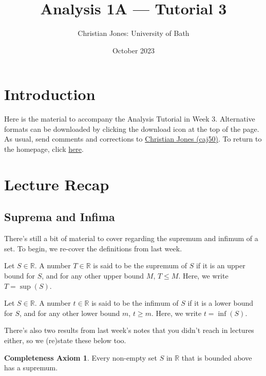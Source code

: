\documentclass[
  12pt,
  a4paper]{extarticle}
\title{Analysis 1A --- Tutorial 3}
\author{Christian Jones: University of Bath}
\date{October 2023}
\theoremstyle{plain}
\theoremstyle{definition}
\theoremstyle{plain}
\theoremstyle{plain}
\theoremstyle{plain}
\theoremstyle{plain}
\theoremstyle{definition}
\theoremstyle{definition}
\newtheorem*{Completeness Axiom*}{Completeness Axiom}\newtheorem{Completeness Axiom}{Completeness Axiom}[section]
\theoremstyle{remark}
\theoremstyle{remark}
\let\BeginKnitrBlock\begin \let\EndKnitrBlock\end
\renewcommand{\;}{\,}
\begin{document}
\maketitle

{
\setcounter{tocdepth}{2}
\tableofcontents
}
\newpage
{}

\hypertarget{introduction}{%
\section*{Introduction}\label{introduction}}

Here is the material to accompany the Analysis Tutorial in Week 3. Alternative formats can be downloaded by clicking the download icon at the top of the page. As usual, send comments and corrections to \href{mailto:caj50@bath.ac.uk}{Christian Jones (caj50)}. To return to the homepage, click \href{http://caj50.github.io/tutoring.html}{here}.

\hypertarget{lecture-recap}{%
\section{Lecture Recap}\label{lecture-recap}}

\hypertarget{suprema-and-infima}{%
\subsection{Suprema and Infima}\label{suprema-and-infima}}

There's still a bit of material to cover regarding the supremum and infimum of a set. To begin, we re-cover the definitions from last week.
\BeginKnitrBlock{definition}[Supremum]
{\label{def:def1} }Let \(S \in \mathbb{R}\). A number \(T \in \mathbb{R}\) is said to be the supremum of \(S\) if it is an upper bound for \(S\), and for any other upper bound \(M\), \(T \leq M\). Here, we write \(T = \sup(S)\).
\EndKnitrBlock{definition}

\BeginKnitrBlock{definition}[Infimum]
{\label{def:def2} }Let \(S \in \mathbb{R}\). A number \(t \in \mathbb{R}\) is said to be the infimum of \(S\) if it is a lower bound for \(S\), and for any other lower bound \(m\), \(t\geq m\). Here, we write \(t = \inf(S)\).
\EndKnitrBlock{definition}
There's also two results from last week's notes that you didn't reach in lectures either, so we (re)state these below too.
\BeginKnitrBlock{Completeness Axiom*}
{}Every non-empty set \(S\) in \(\mathbb{R}\) that is bounded above has a supremum.
\EndKnitrBlock{Completeness Axiom*}
\end{document}
